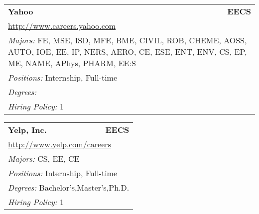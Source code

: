 \documentclass[twoside]{article}
\begin{document}
\begin{center}
\begin{multicols}{3}
\begin{FlushLeft}
\begin{minipage}{\columnwidth}
\end{minipage}
 
\begin{minipage}{\columnwidth}\begin{tabularx}{.95\columnwidth}{Xr}
                 {\Large\bf Yahoo} & {\Large\bf EECS}\\
    \multicolumn{2}{p{.95\columnwidth}}{\url{http://www.careers.yahoo.com}}\\
    \multicolumn{2}{p{.95\columnwidth}}{\emph{Majors:} FE, MSE, ISD, MFE, BME, CIVIL, ROB, CHEME, AOSS, AUTO, IOE, EE, IP, NERS, AERO, CE, ESE, ENT, ENV, CS, EP, ME, NAME, APhys, PHARM, EE:S}\\
    \multicolumn{2}{p{.95\columnwidth}}{\emph{Positions:} Internship, Full-time}\\
    \multicolumn{2}{p{.95\columnwidth}}{\emph{Degrees:} }\\
    \multicolumn{2}{p{.95\columnwidth}}{\emph{Hiring Policy:} 1}\\
    \end{tabularx}
    
\end{minipage}
 
\begin{minipage}{\columnwidth}\begin{tabularx}{.95\columnwidth}{Xr}
                 {\Large\bf Yelp, Inc.} & {\Large\bf EECS}\\
    \multicolumn{2}{p{.95\columnwidth}}{\url{http://www.yelp.com/careers}}\\
    \multicolumn{2}{p{.95\columnwidth}}{\emph{Majors:} CS, EE, CE}\\
    \multicolumn{2}{p{.95\columnwidth}}{\emph{Positions:} Internship, Full-time}\\
    \multicolumn{2}{p{.95\columnwidth}}{\emph{Degrees:} Bachelor's,Master's,Ph.D.}\\
    \multicolumn{2}{p{.95\columnwidth}}{\emph{Hiring Policy:} 1}\\
    \end{tabularx}
    
\end{minipage}
 

\end{FlushLeft}
\end{multicols}
\end{center}
\end{document}
